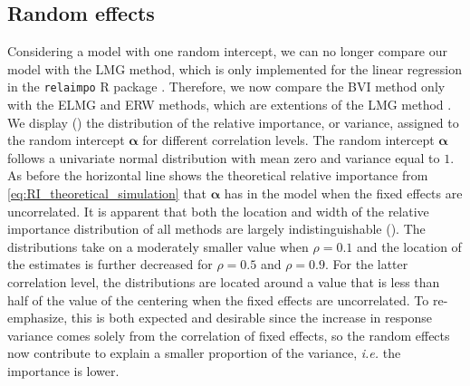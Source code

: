 \subsection{Random effects}
\label{sec:relimp_random}
Considering a model with one random intercept, we can no longer compare our model with the LMG method, which is only implemented for the linear regression in the \texttt{relaimpo} R package \citep{gromping_relaimpo}. Therefore, we now compare the BVI method only with the ELMG and ERW methods, which are extentions of the LMG method \citep{matre}.
We display () the distribution of the relative importance, or variance, assigned to the random intercept $\boldsymbol{\alpha}$ for different correlation levels. 
The random intercept $\boldsymbol{\alpha}$ follows a univariate normal distribution with mean zero and variance equal to $1$.
As before the horizontal line shows the theoretical relative importance from \eqref{eq:RI_theoretical_simulation} that $\boldsymbol{\alpha}$ has in the model when the fixed effects are uncorrelated.
\newline
\newline
It is apparent that both the location and width of the relative importance distribution of all methods are largely indistinguishable (). 
The distributions take on a moderately smaller value when $\rho=0.1$ and the location of the estimates is further decreased for $\rho=0.5$ and $\rho=0.9$. 
For the latter correlation level, the distributions are located around a value that is less than half of the value of the centering when the fixed effects are uncorrelated. 
To re-emphasize, this is both expected and desirable since the increase in response variance comes solely from the correlation of fixed effects, so the random effects now contribute to explain a smaller proportion of the variance, \textit{i.e.} the importance is lower.
